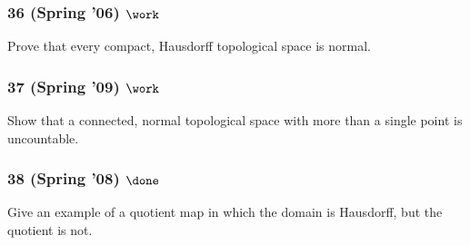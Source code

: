 \hypertarget{spring-06-work-1}{%
\subsubsection{\texorpdfstring{36 (Spring '06)
\(\work\)}{36 (Spring '06) \textbackslash work}}\label{spring-06-work-1}}

\begin{problem}[?]

Prove that every compact, Hausdorff topological space is normal.

\end{problem}

\hypertarget{spring-09-work-1}{%
\subsubsection{\texorpdfstring{37 (Spring '09)
\(\work\)}{37 (Spring '09) \textbackslash work}}\label{spring-09-work-1}}

\begin{problem}[?]

Show that a connected, normal topological space with more than a single
point is uncountable.

\end{problem}

\hypertarget{spring-08-done}{%
\subsubsection{\texorpdfstring{38 (Spring '08)
\(\done\)}{38 (Spring '08) \textbackslash done}}\label{spring-08-done}}

\begin{problem}[?]

Give an example of a quotient map in which the domain is Hausdorff, but
the quotient is not.

\end{problem}


